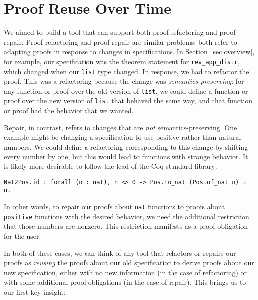 \section{Proof Reuse Over Time}
\label{sec:meat}

We aimed to build a tool that can support both proof refactoring and proof repair.
Proof refactoring and proof repair are similar problems: both refer to adapting proofs in response to changes
in specifications. In Section~\ref{sec:overview}, for example, our specification was the theorem statement
for \lstinline{rev_app_distr}, which changed when our \lstinline{list} type changed.
In response, we had to refactor the proof.
This was a refactoring because the change was \textit{semantics-preserving}:
for any function or proof over the old version of \lstinline{list}, we could define a function or proof over the
new version of \lstinline{list} that behaved the same way, and that function or proof had the behavior that we wanted.

Repair, in contrast, refers to changes that are \textit{not} semantics-preserving.
One example might be changing a specification to use positive rather than natural numbers.
We could define a refactoring corresponding to this change by shifting every number by one,
but this would lead to functions with strange behavior.
It is likely more desirable to follow the lead of the Coq standard library:

\begin{lstlisting}
Nat2Pos.id : forall (n : nat), n <> 0 -> Pos.to_nat (Pos.of_nat n) = n.
\end{lstlisting}
In other words, to repair our proofs about \lstinline{nat} functions to proofs about \lstinline{positive} functions with the desired behavior,
we need the additional restriction that those numbers are nonzero. 
This restriction manifests as a proof obligation for the user.

In both of these cases, we can think of any tool that refactors or repairs our proofs as
\textit{reusing} the proofs about our old specification to derive proofs about our new specification,
either with no new information (in the case of refactoring) or with some additional proof obligations (in the case of repair).
This brings us to our first key insight:

